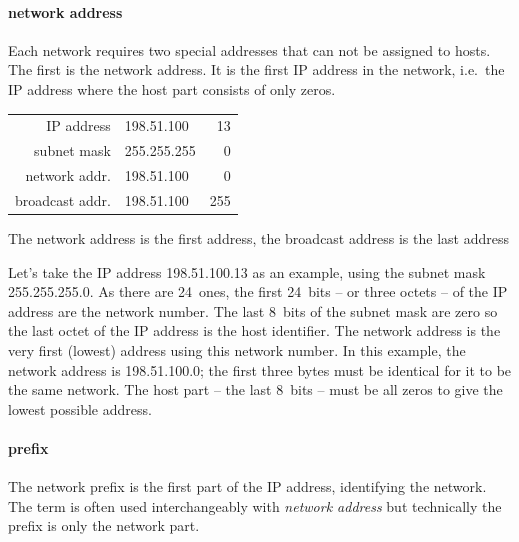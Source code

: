 \paragraph{network address}
Each network requires two special addresses that can not be assigned to hosts.
The first is the network address.
It is the first \acs{IP} address in the network, i.e.~the \acs{IP} address where the host part consists of only zeros.

\begin{margintable}
\begin{tabular}{rl@{.}r}
\textcolor{spot5}{\acs{IP} address}  & \textcolor{spot1}{198.51.100}  & 13 \\
\textcolor{spot5}{subnet mask}       & 255.255.255 &  0 \\
\textcolor{spot5}{network addr.}     & \textcolor{spot1}{198.51.100}  & \textcolor{spot2}{0}   \\
\textcolor{spot5}{broadcast addr.}   & \textcolor{spot1}{198.51.100}  & \textcolor{spot2}{255} \\
\end{tabular}
\caption{The network address is the first address, the broadcast address is the last address}
\label{tab:network-broadcast-address}
\end{margintable}

Let's take the \acs{IP} address 198.51.100.13 as an example, using the subnet mask 255.255.255.0.
As there are 24~ones, the first 24~bits -- or three octets -- of the \acs{IP} address are the network number.
The last 8~bits of the subnet mask are zero so the last octet of the \acs{IP} address is the host identifier.
The network address is the very first (lowest) address using this network number.
In this example, the network address is 198.51.100.0; the first three bytes must be identical for it to be the same network.
The host part -- the last 8~bits -- must be all zeros to give the lowest possible address.

\paragraph{prefix}
The network prefix is the first part of the \acs{IP} address, identifying the network.
The term is often used interchangeably with \emph{network address} but technically the prefix is only the network part.


